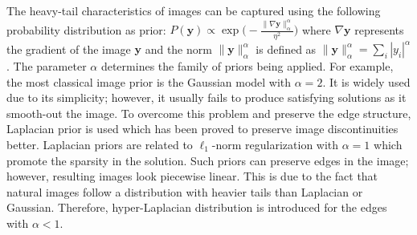 \documentclass[9pt]{article}
\newcommand{\vect}[1]{\pmb{#1}}
\def\bea{\begin{eqnarray}}
\def\eea{\end{eqnarray}}
\begin{document}
The heavy-tail characteristics of  images can be captured using the following probability distribution as prior: $P(\vect y) \propto \exp \Big( -\frac{\|\nabla \vect y \|_\alpha^\alpha }{\eta^2} \Big)$
where $\nabla \vect y$ represents the gradient of the image $\vect y$ and the norm $\|\vect y\|_\alpha^\alpha$ is defined as $\|\vect y\|_\alpha^\alpha = \sum_i |y_i|^\alpha$. The parameter $\alpha$ determines the family of priors being applied. For example, the most classical image prior is the Gaussian model with $\alpha=2$. It is widely used due to its simplicity; however, it usually fails to produce satisfying solutions as it smooth-out the image.
 To overcome this problem and preserve the edge structure, Laplacian prior is used which has been proved to preserve image discontinuities better.
Laplacian priors are related to $\ell_1$-norm regularization with $\alpha=1$ which promote the sparsity in the solution. Such priors can preserve edges in the image; however,  resulting images look piecewise linear. This is due to the fact that natural images follow a distribution with heavier tails than Laplacian or Gaussian. Therefore,  hyper-Laplacian distribution is introduced for the edges \cite{zhang2012generative,krishnan2009fast} with  $\alpha < 1$.
\end{document}
